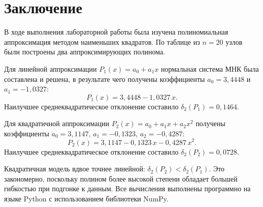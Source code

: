 \section*{Заключение}

В ходе выполнения лабораторной работы была изучена полиномиальная аппроксимация
методом наименьших квадратов. По таблице из $n = 20$ узлов были построены два
аппроксимирующих полинома.

Для линейной аппроксимации $P_1(x) = a_0 + a_1 x$ нормальная система МНК
была составлена и решена, в результате чего получены коэффициенты
$a_0 = 3{,}4448$ и $a_1 = -1{,}0327$:
\[
P_1(x) = 3{,}4448 - 1{,}0327\,x.
\]
Наилучшее среднеквадратическое отклонение составило $\delta_2(P_1) = 0{,}1464$.

Для квадратичной аппроксимации $P_2(x) = a_0 + a_1 x + a_2 x^2$ получены
коэффициенты $a_0 = 3{,}1147$, $a_1 = -0{,}1323$, $a_2 = -0{,}4287$:
\[
P_2(x) = 3{,}1147 - 0{,}1323\,x - 0{,}4287\,x^2.
\]
Наилучшее среднеквадратическое отклонение составило $\delta_2(P_2) = 0{,}0728$.

Квадратичная модель вдвое точнее линейной: $\delta_2(P_2) < \delta_2(P_1)$.
Это закономерно, поскольку полином более высокой степени обладает большей
гибкостью при подгонке к данным. Все вычисления выполнены программно на языке
Python с использованием библиотеки NumPy.